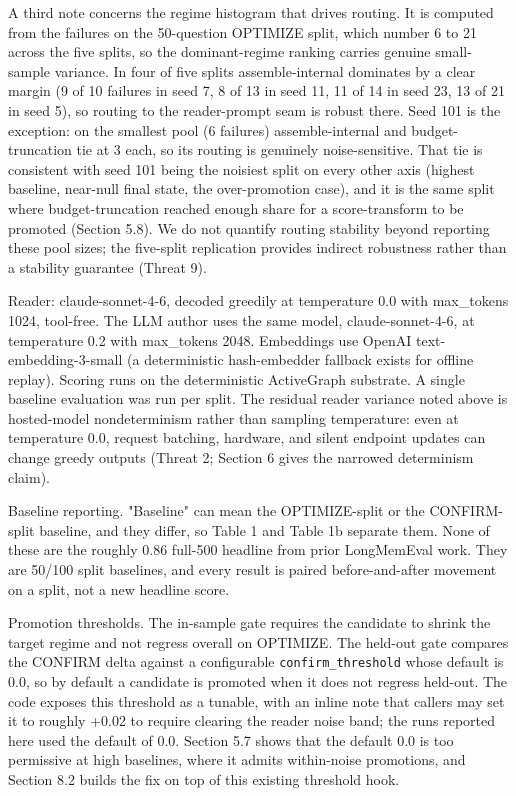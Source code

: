 A third note concerns the regime histogram that drives routing. It is computed from the failures on the 50-question OPTIMIZE split, which number 6 to 21 across the five splits, so the dominant-regime ranking carries genuine small-sample variance. In four of five splits assemble-internal dominates by a clear margin (9 of 10 failures in seed 7, 8 of 13 in seed 11, 11 of 14 in seed 23, 13 of 21 in seed 5), so routing to the reader-prompt seam is robust there. Seed 101 is the exception: on the smallest pool (6 failures) assemble-internal and budget-truncation tie at 3 each, so its routing is genuinely noise-sensitive. That tie is consistent with seed 101 being the noisiest split on every other axis (highest baseline, near-null final state, the over-promotion case), and it is the same split where budget-truncation reached enough share for a score-transform to be promoted (Section 5.8). We do not quantify routing stability beyond reporting these pool sizes; the five-split replication provides indirect robustness rather than a stability guarantee (Threat 9).

Reader: claude-sonnet-4-6, decoded greedily at temperature 0.0 with max\_tokens 1024, tool-free. The LLM author uses the same model, claude-sonnet-4-6, at temperature 0.2 with max\_tokens 2048. Embeddings use OpenAI text-embedding-3-small (a deterministic hash-embedder fallback exists for offline replay). Scoring runs on the deterministic ActiveGraph substrate. A single baseline evaluation was run per split. The residual reader variance noted above is hosted-model nondeterminism rather than sampling temperature: even at temperature 0.0, request batching, hardware, and silent endpoint updates can change greedy outputs (Threat 2; Section 6 gives the narrowed determinism claim).

Baseline reporting. "Baseline" can mean the OPTIMIZE-split or the CONFIRM-split baseline, and they differ, so Table 1 and Table 1b separate them. None of these are the roughly 0.86 full-500 headline from prior LongMemEval work. They are 50/100 split baselines, and every result is paired before-and-after movement on a split, not a new headline score.

Promotion thresholds. The in-sample gate requires the candidate to shrink the target regime and not regress overall on OPTIMIZE. The held-out gate compares the CONFIRM delta against a configurable \texttt{confirm\_threshold} whose default is 0.0, so by default a candidate is promoted when it does not regress held-out. The code exposes this threshold as a tunable, with an inline note that callers may set it to roughly +0.02 to require clearing the reader noise band; the runs reported here used the default of 0.0. Section 5.7 shows that the default 0.0 is too permissive at high baselines, where it admits within-noise promotions, and Section 8.2 builds the fix on top of this existing threshold hook.

